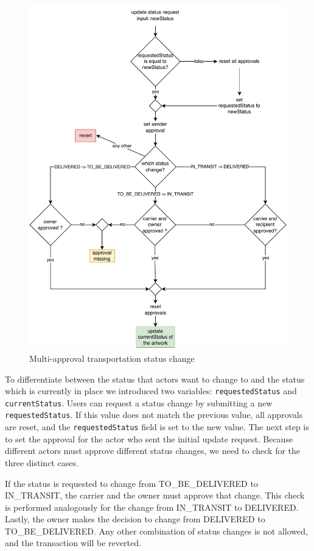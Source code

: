 \begin{figure}[ht]
    \centering
    \includegraphics[height=0.62\textheight, keepaspectratio]{diagrams/update_status.drawio.pdf}
    \caption{Multi-approval transportation status change}
    \label{fig:update_status}
\end{figure}

To differentiate between the status that actors want to change to and the status which is currently in place we introduced two variables: \texttt{requestedStatus} and \texttt{currentStatus}. Users can request a status change by submitting a new \texttt{requestedStatus}. If this value does not match the previous value, all approvals are reset, and the \texttt{requestedStatus} field is set to the new value. The next step is to set the approval for the actor who sent the initial update request. Because different actors must approve different status changes, we need to check for the three distinct cases.

If the status is requested to change from TO\_BE\_DELIVERED to IN\_TRANSIT, the carrier and the owner must approve that change. This check is performed analogously for the change from IN\_TRANSIT to DELIVERED. Lastly, the owner makes the decision to change from DELIVERED to TO\_BE\_DELIVERED. Any other combination of status changes is not allowed, and the transaction will be reverted.

